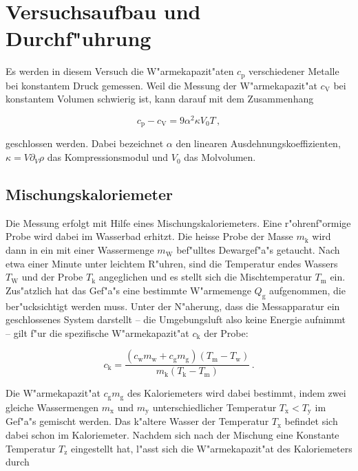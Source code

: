 \section{Versuchsaufbau und Durchf"uhrung} %
\label{sec:durchf_uhrung}
	Es werden in diesem Versuch die W"armekapazit"aten $c_\mathrm{p}$ verschiedener Metalle bei konstantem Druck gemessen.
	Weil die Messung der W"armekapazit"at $c_\mathrm{V}$ bei konstantem Volumen schwierig ist, kann darauf mit dem Zusammenhang

	\begin{equation}
		c_\mathrm{p} - c_\mathrm{V} = 9 \alpha^2 \kappa V_0 T \,,
	\end{equation}

	geschlossen werden.
	Dabei bezeichnet $\alpha$ den linearen Ausdehnungskoeffizienten, $\kappa = V \partial_V \rho$ das Kompressionsmodul und $V_0$ das Molvolumen.

	\subsection{Mischungskaloriemeter}
	\label{subsec:kaloriemeter}
		Die Messung erfolgt mit Hilfe eines Mischungskaloriemeters.
		Eine r"ohrenf"ormige Probe wird dabei im Wasserbad erhitzt.
		Die heisse Probe der Masse $m_\mathrm{k}$ wird dann in ein mit einer Wassermenge $m_\mathrm{W}$ bef"ulltes Dewargef"a"s getaucht.
		Nach etwa einer Minute unter leichtem R"uhren, sind die Temperatur endes Wassers $T_\mathrm{W}$ und der Probe $T_\mathrm{k}$ angeglichen und es stellt sich die Mischtemperatur $T_\mathrm{m}$ ein.
		Zus"atzlich hat das Gef"a"s eine bestimmte W"armemenge $Q_\mathrm{g}$ aufgenommen, die ber"ucksichtigt werden muss.
		Unter der N"aherung, dass die Messapparatur ein geschlossenes System darstellt -- die Umgebungsluft also keine Energie aufnimmt -- gilt f"ur die spezifische W"armekapazit"at $c_\mathrm{k}$ der Probe:

		\begin{equation}
			c_\mathrm{k} = \frac{\left(c_\mathrm{w}m_\mathrm{w} + c_\mathrm{g}m_\mathrm{g}\right)\left(T_\mathrm{m} - T_\mathrm{w} \right)}{m_\mathrm{k} \left(T_\mathrm{k} - T_\mathrm{m} \right)} \,.
		\end{equation}

		Die W"armekapazit"at $c_\mathrm{g}m_\mathrm{g}$ des Kaloriemeters wird dabei bestimmt, indem zwei gleiche Wassermengen $m_\mathrm{x}$ und $m_\mathrm{y}$ unterschiedlicher Temperatur $T_\mathrm{x} < T_\mathrm{y}$ im Gef"a"s gemischt werden.
		Das k"altere Wasser der Temperatur $T_\mathrm{x}$ befindet sich dabei schon im Kaloriemeter.
		Nachdem sich nach der Mischung eine Konstante Temperatur $T_\mathrm{z}$ eingestellt hat, l"asst sich die W"armekapazit"at des Kaloriemeters durch

